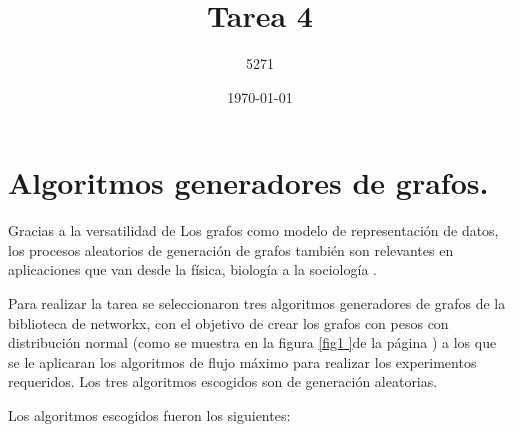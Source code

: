 \documentclass{article}
\title{Tarea 4}
\author{5271}
\date{\today}
\begin{document}
\maketitle

\section{Algoritmos generadores de grafos.}

Gracias a la versatilidad de Los grafos como modelo de representación de datos, los procesos aleatorios de generación de grafos también son relevantes en aplicaciones que van desde la física, biología a la sociología \cite{Nobari} .

Para realizar la tarea se seleccionaron tres algoritmos generadores de grafos de la biblioteca de networkx, con el objetivo de crear los grafos con pesos con distribución normal (como se muestra en la figura \ref{fig1 }de la página \pageref{fig1}) a los que se le aplicaran los algoritmos de flujo máximo para realizar los experimentos requeridos. Los tres algoritmos escogidos son de generación aleatorias.
 
Los algoritmos escogidos fueron los siguientes:
\end{document}
